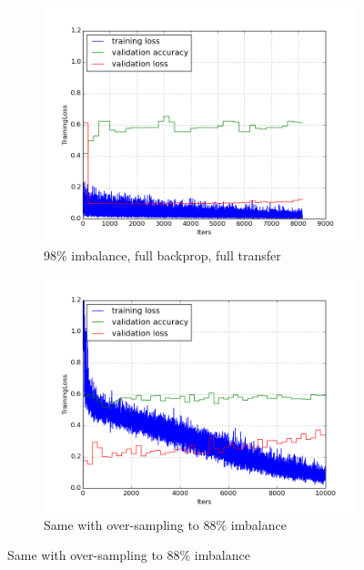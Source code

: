 \documentclass[a4paper,11pt]{article}
\begin{document}
\begin{figure}[!]
    \centering
    \begin{minipage}[b]{\textwidth}
      \begin{subfigure}{.5\textwidth} 
        \centering
        \includegraphics[scale=0.4]{images/plot_clampdetCI98_none_bs128_lr4.png}
        \caption{98\% imbalance, full backprop, full transfer}\label{fig:2a}
      \end{subfigure}%
      \begin{subfigure}{.5\textwidth} 
        \centering
        \includegraphics[scale=0.4]{images/plot_clampdet_os_none_reinit.png}
        \caption{Same with over-sampling to 88\% imbalance}\label{fig:2b}
      \end{subfigure} \par \vspace*{20pt} %
    \end{minipage}%
    \label{f49}
\end{figure}
\end{document}
